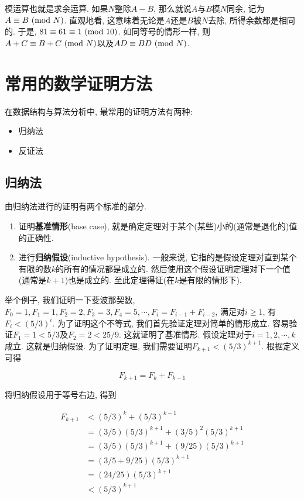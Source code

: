 \documentclass[oneside,10pt,fontset=none]{ctexbook}
\numberwithin{definition}{chapter}
\numberwithin{theorem}{chapter}
\numberwithin{proof}{chapter}
\begin{document}
模运算也就是求余运算. 如果$N$整除$A-B$, 那么就说$A$与$B$模$N$同余, 记为$A\equiv B\ (\mathrm{mod}\ N)$. 直观地看, 这意味着无论是$A$还是$B$被$N$去除, 所得余数都是相同的. 于是, $81\equiv 61\equiv 1\ (\mathrm{mod}\ 10)$. 如同等号的情形一样, 则$A+C\equiv B+C\ (\mathrm{mod}\ N)$以及$AD\equiv BD\ (\mathrm{mod}\ N)$.

\section{常用的数学证明方法}

在数据结构与算法分析中, 最常用的证明方法有两种:

\begin{itemize}
    \item 归纳法
    \item 反证法
\end{itemize}

\subsection{归纳法}

由归纳法进行的证明有两个标准的部分.

\begin{enumerate}
    \item 证明\textbf{基准情形}(base case), 就是确定定理对于某个(某些)小的(通常是退化的)值的正确性.
    \item 进行\textbf{归纳假设}(inductive hypothesis). 一般来说, 它指的是假设定理对直到某个有限的数$k$的所有的情况都是成立的. 然后使用这个假设证明定理对下一个值(通常是$k+1$)也是成立的. 至此定理得证(在$k$是有限的情形下).
\end{enumerate}

举个例子, 我们证明一下斐波那契数, $F_0=1,F_1=1,F_2=2,F_3=3,F_4=5,\cdots,F_i=F_{i-1}+F_{i-2}$, 满足对$i\geq 1$, 有$F_i<(5/3)^i$. 为了证明这个不等式, 我们首先验证定理对简单的情形成立. 容易验证$F_1=1<5/3$及$F_2=2<25/9$. 这就证明了基准情形. 假设定理对于$i=1,2,\cdots,k$成立. 这就是归纳假设. 为了证明定理, 我们需要证明$F_{k+1}<(5/3)^{k+1}$. 根据定义可得

$$
F_{k+1} = F_k + F_{k-1}
$$

将归纳假设用于等号右边, 得到

\begin{equation*}
    \begin{split}
        F_{k+1} &< (5/3)^k + (5/3)^{k-1} \\
                &= (3/5)(5/3)^{k+1} + (3/5)^2(5/3)^{k+1} \\
                &= (3/5)(5/3)^{k+1} + (9/25)(5/3)^{k+1} \\
                &= (3/5+9/25)(5/3)^{k+1} \\
                &= (24/25)(5/3)^{k+1} \\
                &< (5/3)^{k+1}
    \end{split}
\end{equation*}
\end{document}
